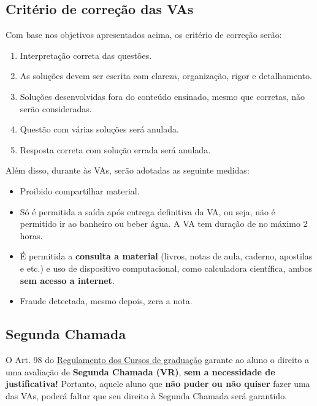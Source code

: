 \documentclass[
  letterpaper,
  DIV=11,
  numbers=noendperiod]{scrartcl}
\providecommand{\tightlist}{%
  \setlength{\itemsep}{0pt}\setlength{\parskip}{0pt}}
\begin{document}
\subsection*{Critério de correção das
VAs}\label{crituxe9rio-de-correuxe7uxe3o-das-vas}

Com base nos objetivos apresentados acima, os critério de correção
serão:

\begin{enumerate}
\def\labelenumi{\arabic{enumi}.}
\tightlist
\item
  Interpretação correta das questões.
\item
  As soluções devem ser escrita com clareza, organização, rigor e
  detalhamento.
\item
  Soluções desenvolvidas fora do conteúdo ensinado, mesmo que corretas,
  não serão consideradas.
\item
  Questão com várias soluções será anulada.
\item
  Resposta correta com solução errada será anulada.
\end{enumerate}

Além disso, durante às VAs, serão adotadas as seguinte medidas:

\begin{itemize}
\tightlist
\item
  Proibido compartilhar material.
\item
  Só é permitida a saída após entrega definitiva da VA, ou seja, não é
  permitido ir ao banheiro ou beber água. A VA tem duração de no máximo
  2 horas.
\item
  É permitida a \textbf{consulta a material} (livros, notas de aula,
  caderno, apostilas e etc.) e uso de dispositivo computacional, como
  calculadora científica, ambos \textbf{sem acesso a internet}.
\item
  Fraude detectada, mesmo depois, zera a nota.
\end{itemize}

\subsection*{Segunda Chamada}\label{segunda-chamada}

O Art. 98 do
\href{http://www.uff.br/sites/default/files/001-2015_regulamento_do_curso_de_graduacao_0.pdf\#page=55}{Regulamento
dos Cursos de graduação} garante ao aluno o direito a uma avaliação de
\textbf{Segunda Chamada (VR)}, \textbf{sem a necessidade de
justificativa!} Portanto, aquele aluno que \textbf{não puder ou não
quiser} fazer uma das VAs, poderá faltar que seu direito à Segunda
Chamada será garantido.
\end{document}
